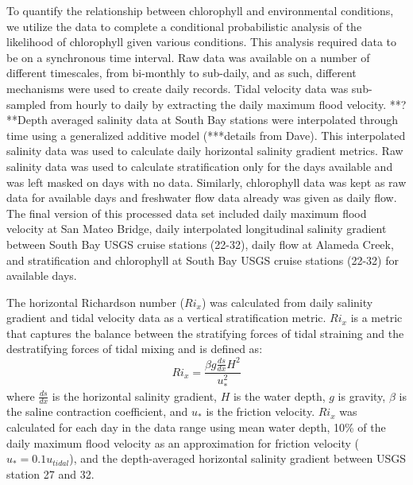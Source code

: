 \documentclass[preprint,review,12pt]{elsarticle}
\begin{document}
To quantify the relationship between chlorophyll and environmental conditions, we utilize the data to complete a conditional probabilistic analysis of the likelihood of chlorophyll given various conditions. This analysis required data to be on a synchronous time interval. Raw data was available on a number of different timescales, from bi-monthly to sub-daily, and as such, different mechanisms were used to create daily records. Tidal velocity data was sub-sampled from hourly to daily by extracting the daily maximum flood velocity. **?**Depth averaged salinity data at South Bay stations were interpolated through time using a generalized additive model (***details from Dave). This interpolated salinity data was used to calculate daily horizontal salinity gradient metrics. Raw salinity data was used to calculate stratification only for the days available and was left masked on days with no data. Similarly, chlorophyll data was kept as raw data for available days and freshwater flow data already was given as daily flow. The final version of this processed data set included daily maximum flood velocity at San Mateo Bridge, daily interpolated longitudinal salinity gradient between South Bay USGS cruise stations (22-32), daily flow at Alameda Creek, and stratification and chlorophyll at South Bay USGS cruise stations (22-32) for available days. 

The horizontal Richardson number (\(Ri_x\)) was calculated from daily salinity gradient and tidal velocity data as a vertical stratification metric. \(Ri_x\) is a metric that captures the balance between the stratifying forces of tidal straining and the destratifying forces of tidal mixing and is defined as:
\begin{equation}
    Ri_x = \frac{\beta g \frac{ds}{dx} H^2}{u_*^2}
\end{equation}
where \(\frac{ds}{dx}\) is the horizontal salinity gradient, \(H\) is the water depth, \(g\) is gravity, \(\beta\) is the saline contraction coefficient, and \(u_*\) is the friction velocity. \(Ri_x\) was calculated for each day in the data range using mean water depth, 10\% of the daily maximum flood velocity as an approximation for friction velocity (\(u_* = 0.1 u_{tidal}\)), and the depth-averaged horizontal salinity gradient between USGS station 27 and 32. 
\end{document}
